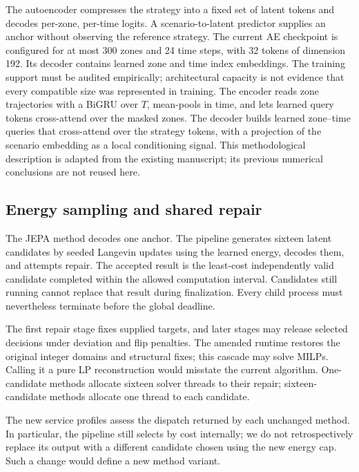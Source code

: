 The autoencoder compresses the strategy into a fixed set of latent tokens and
decodes per-zone, per-time logits. A scenario-to-latent predictor supplies an
anchor without observing the reference strategy. The current AE checkpoint is
configured for at most 300 zones and 24 time steps, with 32 tokens of dimension
192. Its decoder contains learned zone and time index embeddings. The training
support must be audited empirically; architectural capacity is not evidence
that every compatible size was represented in training.
The encoder reads zone trajectories with a BiGRU over $T$, mean-pools in time,
and lets learned query tokens cross-attend over the masked zones. The decoder
builds learned zone--time queries that cross-attend over the strategy tokens,
with a projection of the scenario embedding as a local conditioning signal.
This methodological description is adapted from the existing manuscript;
its previous numerical conclusions are not reused here.

\subsection{Energy sampling and shared repair}
The JEPA method decodes one anchor. The pipeline generates sixteen latent
candidates by seeded Langevin updates using the learned energy, decodes them,
and attempts repair. The accepted result is the least-cost independently valid
candidate completed within the allowed computation interval. Candidates still
running cannot replace that result during finalization. Every child process
must nevertheless terminate before the global deadline.

The first repair stage fixes supplied targets, and later stages may release
selected decisions under deviation and flip penalties. The amended runtime
restores the original integer domains and structural fixes; this cascade may
solve MILPs. Calling it a pure LP reconstruction would misstate the current
algorithm. One-candidate methods allocate sixteen solver threads to their
repair; sixteen-candidate methods allocate one thread to each candidate.

The new service profiles assess the dispatch returned by each unchanged
method. In particular, the pipeline still selects by cost internally; we do
not retrospectively replace its output with a different candidate chosen
using the new energy cap. Such a change would define a new method variant.

